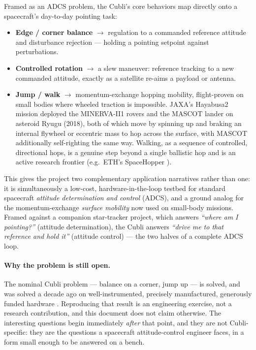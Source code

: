 Framed as an ADCS problem, the Cubli's core behaviors map directly onto a spacecraft's day-to-day pointing task:

\begin{itemize}
    \item \textbf{Edge / corner balance} $\rightarrow$ regulation to a commanded reference attitude and disturbance rejection — holding a pointing setpoint against perturbations.
    \item \textbf{Controlled rotation} $\rightarrow$ a slew maneuver: reference tracking to a new commanded attitude, exactly as a satellite re-aims a payload or antenna.
    \item \textbf{Jump / walk} $\rightarrow$ momentum-exchange hopping mobility, flight-proven on small bodies where wheeled traction is impossible. JAXA's Hayabusa2 mission deployed the MINERVA-II1 rovers \cite{yoshimitsu1999minerva} and the MASCOT lander \cite{ho2017mascot} on asteroid Ryugu (2018), both of which move by spinning up and braking an internal flywheel or eccentric mass to hop across the surface, with MASCOT additionally self-righting the same way. Walking, as a sequence of controlled, directional hops, is a genuine step beyond a single ballistic hop and is an active research frontier (e.g.\ ETH's SpaceHopper \cite{spiridonov2024spacehopper}).
\end{itemize}

This gives the project two complementary application narratives rather than one: it is simultaneously a low-cost, hardware-in-the-loop testbed for standard spacecraft \emph{attitude determination and control} (ADCS), and a ground analog for the momentum-exchange \emph{surface mobility} now used on small-body missions. Framed against a companion star-tracker project, which answers \emph{``where am I pointing?''} (attitude determination), the Cubli answers \emph{``drive me to that reference and hold it''} (attitude control) — the two halves of a complete ADCS loop.

\paragraph{Why the problem is still open.} The nominal Cubli problem --- balance on a corner, jump up --- is solved, and was solved a decade ago on well-instrumented, precisely manufactured, generously funded hardware \cite{gajamohan2012cubli, gajamohan2013cubli, muehlebach2017cubli}. Reproducing that result is an engineering exercise, not a research contribution, and this document does not claim otherwise. The interesting questions begin immediately \emph{after} that point, and they are not Cubli-specific: they are the questions a spacecraft attitude-control engineer faces, in a form small enough to be answered on a bench.

